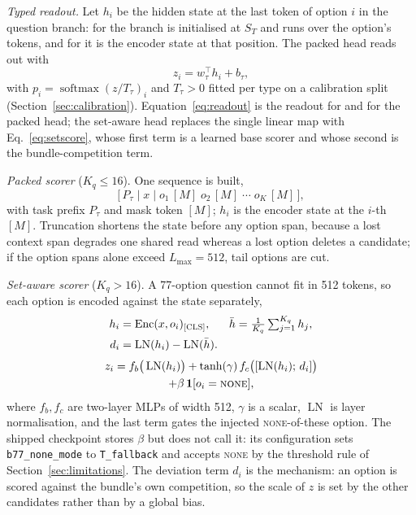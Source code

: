 \emph{Typed readout.} Let $h_i$ be the hidden state at the last token of option $i$ in the question
branch: for \stream{} the branch is initialised at $S_T$ and runs over the option's tokens, and for
\vsix{} it is the encoder state at that position. The packed head reads out with
\begin{equation}
z_i = w_\tau^{\top} h_i + b_\tau, \label{eq:readout}
\end{equation}
with $p_i=\operatorname{softmax}(z/T_\tau)_i$ and $T_\tau>0$ fitted per type on a calibration split
(Section~\ref{sec:calibration}). Equation~\eqref{eq:readout} is the readout for \stream{} and for
the packed head; the set-aware head replaces the single linear map with Eq.~\eqref{eq:setscore},
whose first term is a learned base scorer and whose second is the bundle-competition term.

\emph{Packed scorer} ($K_q\le16$). One sequence is built,
\begin{equation}
\big[\,P_\tau\;|\;x\;|\;o_1\,[M]\;o_2\,[M]\;\cdots\;o_K\,[M]\,\big], \label{eq:packed}
\end{equation}
with task prefix $P_\tau$ and mask token $[M]$; $h_i$ is the encoder state at the $i$-th $[M]$.
Truncation shortens the state before any option span, because a lost context span degrades one
shared read whereas a lost option deletes a candidate; if the option spans alone exceed
$L_{\max}=512$, tail options are cut.

\emph{Set-aware scorer} ($K_q>16$). A 77-option question cannot fit in 512 tokens, so each option
is encoded against the state separately,
\begin{align}
h_i &= \operatorname{Enc}(x,o_i)_{\textsc{[CLS]}}, &
\bar h &= \tfrac{1}{K_q}\textstyle\sum_{j=1}^{K_q} h_j, \label{eq:seth}\\
d_i &= \operatorname{LN}(h_i)-\operatorname{LN}(\bar h). & &
\label{eq:dev}
\end{align}
\begin{multline}
z_i = f_b\big(\operatorname{LN}(h_i)\big)
 + \tanh(\gamma)\, f_c\big([\operatorname{LN}(h_i);\,d_i]\big) \\
 + \beta\,\mathbf{1}[o_i=\textsc{none}], \label{eq:setscore}
\end{multline}
where $f_b,f_c$ are two-layer MLPs of width 512, $\gamma$ is a scalar, $\operatorname{LN}$ is layer
normalisation, and the last term gates the injected \textsc{none}-of-these option. The shipped
checkpoint stores $\beta$ but does not call it: its configuration sets
\texttt{b77\_none\_mode} to \texttt{T\_fallback} and accepts \textsc{none} by the threshold rule of
Section~\ref{sec:limitations}. The deviation
term $d_i$ is the mechanism: an option is scored against the bundle's own competition, so the scale
of $z$ is set by the other candidates rather than by a global bias.

